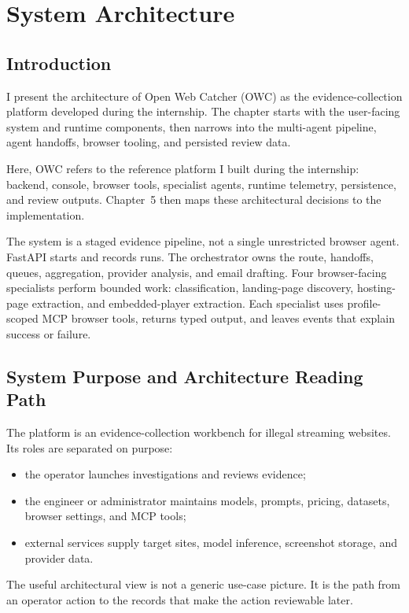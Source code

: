 \chapter{System Architecture}\label{chap:architecture}

\section{Introduction}

I present the architecture of Open Web Catcher (OWC) as the evidence-collection
platform developed during the internship. The chapter starts with the user-facing
system and runtime components, then narrows into the multi-agent pipeline, agent
handoffs, browser tooling, and persisted review data.

Here, OWC refers to the reference platform I built during the internship:
backend, console, browser tools, specialist agents, runtime telemetry, persistence,
and review outputs. Chapter~5 then maps these architectural decisions to the
implementation.

The system is a staged evidence pipeline, not a single unrestricted browser agent.
FastAPI starts and records runs. The orchestrator owns the route,
handoffs, queues, aggregation, provider analysis, and email drafting. Four
browser-facing specialists perform bounded work: classification, landing-page
discovery, hosting-page extraction, and embedded-player extraction. Each specialist
uses profile-scoped MCP browser tools, returns typed output, and leaves events that
explain success or failure.

\section{System Purpose and Architecture Reading Path}

The platform is an evidence-collection workbench for illegal streaming websites. Its
roles are separated on purpose:
\begin{itemize}
  \item the operator launches investigations and reviews evidence;
  \item the engineer or administrator maintains models, prompts, pricing, datasets,
  browser settings, and MCP tools;
  \item external services supply target sites, model inference, screenshot storage, and
  provider data.
\end{itemize}

The useful architectural view is not a generic use-case picture. It is the path
from an operator action to the records that make the action reviewable later.

